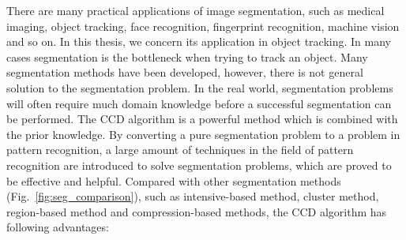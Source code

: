 There are many practical
applications of image segmentation, such as medical imaging, object
tracking, face recognition, fingerprint recognition, machine vision and
so on. In this thesis, we concern its application in object tracking.
In many cases segmentation is the bottleneck when trying to track an
object. Many segmentation methods have been developed, however, there is not
general solution to the segmentation problem. In the real world,
segmentation problems will often require much domain knowledge before
a successful segmentation can be performed. The CCD algorithm is a
powerful method which is combined with the prior knowledge. By
converting a pure segmentation problem to a problem in pattern
recognition, a large amount of techniques in the field of pattern
recognition are introduced to solve segmentation problems, which are
proved to be effective and helpful. Compared with other segmentation
methods (Fig.~\ref{fig:seg_comparison}), such as intensive-based method,  cluster method, region-based
method and compression-based methods, the CCD algorithm has following
advantages:
